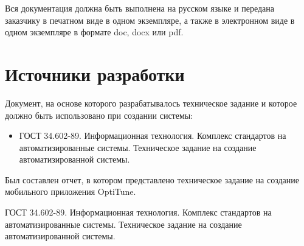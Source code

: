 \documentclass[14pt]{extreport}
\begin{document}
Вся документация должна быть выполнена на русском языке и передана заказчику в печатном виде в одном экземпляре, а также в электронном виде в одном экземпляре в формате doc, docx или pdf.


\chapter{Источники разработки}
Документ, на основе которого разрабатывалось техническое задание и которое должно быть использовано при создании системы:
\begin{itemize}
	\item ГОСТ 34.602-89. Информационная технология. Комплекс стандартов на автоматизированные системы. Техническое задание на создание автоматизированной системы.
\end{itemize}


\conclusions

Был составлен отчет, в котором представлено техническое задание на создание мобильного приложения OptiTune.


\newpage
\begin{thebibliography}{99}

 ГОСТ 34.602-89. Информационная технология. Комплекс стандартов на автоматизированные системы. Техническое задание на создание автоматизированной системы.

\end{thebibliography}
\end{document}
